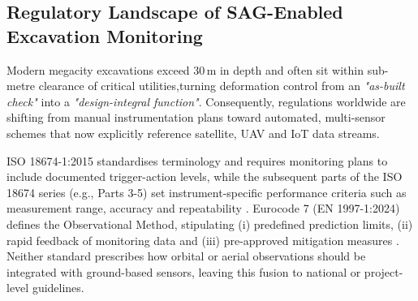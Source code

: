 \documentclass[preprint,11pt,authoryear,3p]{elsarticle}
\begin{document}
\subsection{Regulatory Landscape of SAG-Enabled Excavation Monitoring}

Modern megacity excavations exceed 30\,m in depth and often sit within sub-metre clearance of critical utilities,turning deformation control from an \emph{"as-built check"} into a \emph{"design-integral function"}. Consequently, regulations worldwide are shifting from manual instrumentation plans toward automated, multi-sensor schemes that now explicitly reference satellite, UAV and IoT data streams.

ISO 18674-1:2015 standardises terminology and requires monitoring plans to include documented trigger-action levels, while the subsequent parts of the ISO 18674 series (e.g., Parts 3-5) set instrument-specific performance criteria such as measurement range, accuracy and repeatability \citep{ISO18674-1:2015, ISO18674-2:2016, ISO18674-3:2017, ISO18674-4:2020, ISO18674-5:2019, ISO18674-6:2025, ISO18674-7:2024, ISO18674-8:2023}. Eurocode 7 (EN 1997-1:2024) defines the Observational Method, stipulating (i) predefined prediction limits, (ii) rapid feedback of monitoring data and (iii) pre-approved mitigation measures \citep{EN1997-1:2024}. Neither standard prescribes how orbital or aerial observations should be integrated with ground-based sensors, leaving this fusion to national or project-level guidelines.
\end{document}
